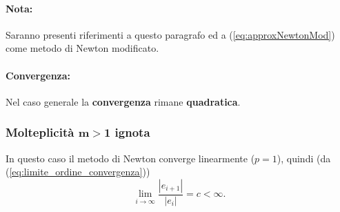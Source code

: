 \paragraph{Nota:} Saranno presenti riferimenti a questo paragrafo ed a (\ref{eq:approxNewtonMod}) come metodo di Newton modificato.

\paragraph{Convergenza:} Nel caso generale la \textbf{convergenza} rimane \textbf{quadratica}.

\subsubsection{Molteplicità \texorpdfstring{$\boldsymbol{m>1}$}{m>1} ignota}
In questo caso il metodo di Newton converge linearmente ($p=1$), quindi (da (\ref{eq:limite_ordine_convergenza}))
\begin{equation*}
	\underset{i\to\infty}{\lim}{\frac{|e_{i+1}|}{|e_i|}} = c<\infty.
\end{equation*}

